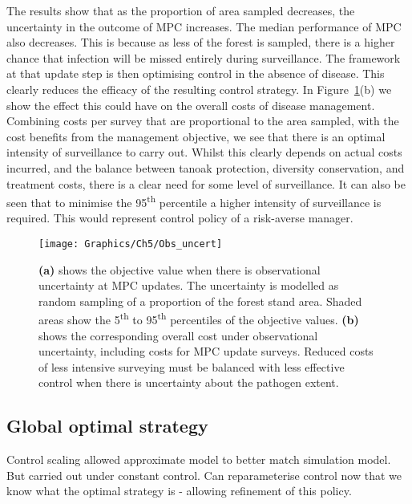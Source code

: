 The results show that as the proportion of area sampled decreases, the uncertainty in the outcome of MPC increases. The median performance of MPC also decreases. This is because as less of the forest is sampled, there is a higher chance that infection will be missed entirely during surveillance. The framework at that update step is then optimising control in the absence of disease. This clearly reduces the efficacy of the resulting control strategy. In Figure~\ref{fig:ch5:obs_uncert}(b) we show the effect this could have on the overall costs of disease management. Combining costs per survey that are proportional to the area sampled, with the cost benefits from the management objective, we see that there is an optimal intensity of surveillance to carry out. Whilst this clearly depends on actual costs incurred, and the balance between tanoak protection, diversity conservation, and treatment costs, there is a clear need for some level of surveillance. It can also be seen that to minimise the 95\textsuperscript{th} percentile a higher intensity of surveillance is required. This would represent control policy of a risk-averse manager.

\begin{figure}
    \begin{center}
        \texttt{[image: Graphics/Ch5/Obs\_uncert]}
        \caption[Performance of MPC under observational uncertainty]{\textbf{(a)} shows the objective value when there is observational uncertainty at MPC updates. The uncertainty is modelled as random sampling of a proportion of the forest stand area. Shaded areas show the 5\textsuperscript{th} to 95\textsuperscript{th} percentiles of the objective values. \textbf{(b)} shows the corresponding overall cost under observational uncertainty, including costs for MPC update surveys. Reduced costs of less intensive surveying must be balanced with less effective control when there is uncertainty about the pathogen extent.\label{fig:ch5:obs_uncert}}
    \end{center}
\end{figure}

\subsection{Global optimal strategy}

Control scaling allowed approximate model to better match simulation model. But carried out under constant control. Can reparameterise control now that we know what the optimal strategy is - allowing refinement of this policy.

